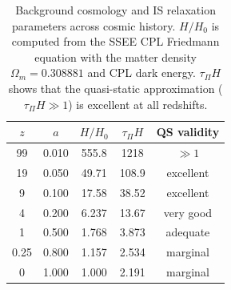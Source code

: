 \documentclass[12pt,a4paper]{article}
\newcommand{\tauPi}{\tau_\Pi}
\begin{document}
\begin{table}[h!]
\centering
\caption{Background cosmology and IS relaxation parameters across cosmic history.
  $H/H_0$ is computed from the SSEE CPL Friedmann equation with the matter
  density $\Omega_m=0.308881$ and CPL dark energy.%
  $\tauPi H$ shows that the quasi-static approximation ($\tauPi H \gg 1$) is
  excellent at all redshifts.}
\label{tab:background}
\begin{tabular}{ccccc}
\toprule
$z$ & $a$ & $H/H_0$ & $\tauPi H$ & QS validity \\
\midrule
99   & 0.010 & 555.8 & 1218   & $\gg 1$ \\
19   & 0.050 & 49.71 & 108.9  & excellent \\
9    & 0.100 & 17.58 & 38.52  & excellent \\
4    & 0.200 & 6.237 & 13.67  & very good \\
1    & 0.500 & 1.768 & 3.873  & adequate \\
0.25 & 0.800 & 1.157 & 2.534  & marginal \\
0    & 1.000 & 1.000 & 2.191  & marginal \\
\bottomrule
\end{tabular}
\end{table}
\end{document}
